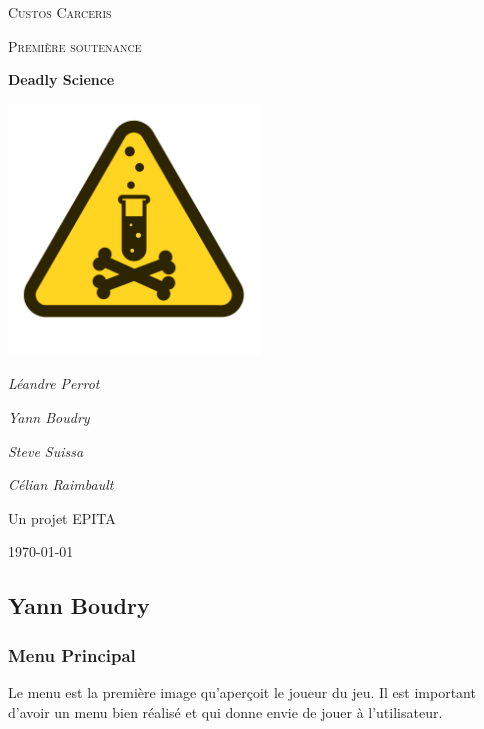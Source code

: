 \documentclass{article}
\begin{document}
\begin{titlepage}
	\centering
	{\scshape\LARGE Custos Carceris\par}
	\vspace{1cm}
	{\scshape\Large Première soutenance \par}
	\vspace{1.5cm}
	{\huge\bfseries Deadly Science\par}
	\vspace{2cm}
	\includegraphics[width=0.5\textwidth]{logo.png}\par\vspace{1cm}
	{\Large\itshape Léandre Perrot\par}
	{\Large\itshape Yann Boudry\par}
	{\Large\itshape Steve Suissa\par}
	{\Large\itshape Célian Raimbault\par}
	\vfill
	Un projet EPITA
	\vfill
	{\large \today\par}
\end{titlepage}



\newpage
\tableofcontents



\newpage
\subsection{Yann Boudry}

\subsubsection{Menu Principal}

Le menu est la première image qu'aperçoit le joueur du jeu. Il est important d'avoir un menu bien réalisé et qui donne envie de jouer à l'utilisateur.
\end{document}
